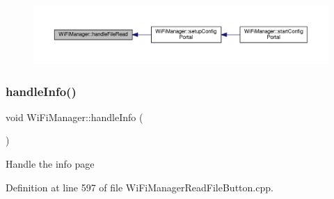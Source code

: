 \nopagebreak
\begin{figure}[H]
\begin{center}
\leavevmode
\includegraphics[width=350pt]{d4/dc8/class_wi_fi_manager_a9e802fa4ca834a622f058a7176f47806_icgraph}
\end{center}
\end{figure}
\mbox{\label{class_wi_fi_manager_ac35e46661f8a209d84bba62d9aa43a35}} 
\subsubsection{\texorpdfstring{handle\+Info()}{handleInfo()}}
{\footnotesize\ttfamily void Wi\+Fi\+Manager\+::handle\+Info (\begin{DoxyParamCaption}{ }\end{DoxyParamCaption})\hspace{0.3cm}{\ttfamily [private]}}

Handle the info page 

Definition at line 597 of file Wi\+Fi\+Manager\+Read\+File\+Button.\+cpp.



